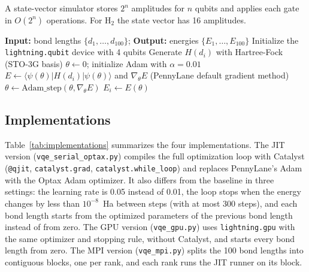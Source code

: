 \documentclass[11pt]{article}
\begin{document}
A state-vector simulator stores $2^n$ amplitudes for $n$ qubits and applies each gate in $O(2^n)$ operations. For H$_2$ the state vector has 16 amplitudes.

\begin{algorithm}[t]
    \caption{Serial VQE baseline for the H$_2$ potential energy surface}
    \label{alg:serial}
    \begin{algorithmic}[1]
        \State \textbf{Input:} bond lengths $\{d_1, \ldots, d_{100}\}$; \textbf{Output:} energies $\{E_1, \ldots, E_{100}\}$
        \State Initialize the \texttt{lightning.qubit} device with 4 qubits
        \State Generate $H(d_i)$ with Hartree-Fock (STO-3G basis)
        \State $\theta \gets 0$; initialize Adam with $\alpha = 0.01$
        \State $E \gets \langle \psi(\theta) | H(d_i) | \psi(\theta) \rangle$ and $\nabla_\theta E$ (PennyLane default gradient method)
        \State $\theta \gets \text{Adam\_step}(\theta, \nabla_\theta E)$
        \EndFor
        \State $E_i \gets E(\theta)$
        \EndFor
    \end{algorithmic}
\end{algorithm}

\subsection{Implementations}

Table~\ref{tab:implementations} summarizes the four implementations. The JIT version (\texttt{vqe\_serial\_optax.py}) compiles the full optimization loop with Catalyst (\texttt{@qjit}, \texttt{catalyst.grad}, \texttt{catalyst.while\_loop}) and replaces PennyLane's Adam with the Optax Adam optimizer. It also differs from the baseline in three settings: the learning rate is 0.05 instead of 0.01, the loop stops when the energy changes by less than $10^{-8}$~Ha between steps (with at most 300 steps), and each bond length starts from the optimized parameters of the previous bond length instead of from zero. The GPU version (\texttt{vqe\_gpu.py}) uses \texttt{lightning.gpu} with the same optimizer and stopping rule, without Catalyst, and starts every bond length from zero. The MPI version (\texttt{vqe\_mpi.py}) splits the 100 bond lengths into contiguous blocks, one per rank, and each rank runs the JIT runner on its block.
\end{document}
